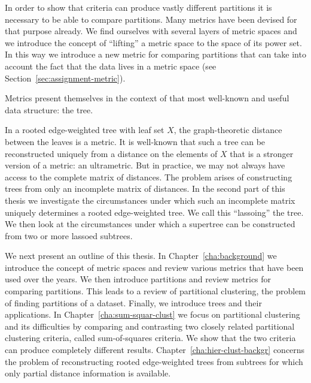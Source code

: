 In order to show that criteria can produce vastly different partitions it is
necessary to be able to compare partitions.  Many metrics have been devised
for that purpose already.  We find ourselves with several layers of metric
spaces and we introduce the concept of ``lifting'' a metric space to the space
of its power set.  In this way we introduce a new metric for comparing
partitions that can take into account the fact that the data lives in a metric
space (see Section~\ref{sec:assignment-metric}).

Metrics present themselves in the context of that most well-known and useful
data structure: the tree.

In a rooted edge-weighted tree with leaf set $X$, the graph-theoretic distance
between the leaves is a metric.  It is well-known that such a tree can be
reconstructed uniquely from a distance on the elements of $X$ that is a
stronger version of a metric: an ultrametric.  But in practice, we may not
always have access to the complete matrix of distances.  The problem arises of
constructing trees from only an incomplete matrix of distances.  In the second
part of this thesis we investigate the circumstances under which such an
incomplete matrix uniquely determines a rooted edge-weighted tree.  We call
this ``lassoing'' the tree.  We then look at the circumstances under which a
supertree can be constructed from two or more lassoed subtrees.

We next present an outline of this thesis. In Chapter~\ref{cha:background} we
introduce the concept of metric spaces and review various metrics that have
been used over the years.  We then introduce partitions and review metrics for
comparing partitions.  This leads to a review of partitional clustering, the
problem of finding partitions of a dataset.  Finally, we introduce trees and
their applications.  In Chapter~\ref{cha:sum-squar-clust} we focus on
partitional clustering and its difficulties by comparing and contrasting two
closely related partitional clustering criteria, called sum-of-squares
criteria.  We show that the two criteria can produce completely different
results.  Chapter~\ref{cha:hier-clust-backgr} concerns the problem of
reconstructing rooted edge-weighted trees from subtrees for which only partial
distance information is available.


